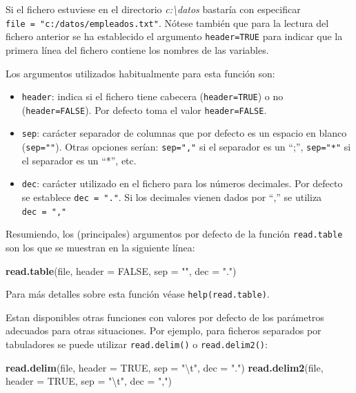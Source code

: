 \documentclass[]{book}
\newenvironment{Shaded}{\begin{snugshade}}{\end{snugshade}}
\newcommand{\CharTok}[1]{\textcolor[rgb]{0.31,0.60,0.02}{#1}}
\newcommand{\DataTypeTok}[1]{\textcolor[rgb]{0.13,0.29,0.53}{#1}}
\newcommand{\KeywordTok}[1]{\textcolor[rgb]{0.13,0.29,0.53}{\textbf{#1}}}
\newcommand{\NormalTok}[1]{#1}
\newcommand{\OtherTok}[1]{\textcolor[rgb]{0.56,0.35,0.01}{#1}}
\newcommand{\StringTok}[1]{\textcolor[rgb]{0.31,0.60,0.02}{#1}}
\begin{document}
Si el fichero estuviese en el directorio \emph{c:\textbackslash{}datos} bastaría con especificar
\texttt{file\ =\ "c:/datos/empleados.txt"}.
Nótese también que para la lectura del fichero anterior se ha
establecido el argumento \texttt{header=TRUE} para indicar que la primera línea del
fichero contiene los nombres de las variables.

Los argumentos utilizados habitualmente para esta función son:

\begin{itemize}
\item
  \texttt{header}: indica si el fichero tiene cabecera (\texttt{header=TRUE}) o no
  (\texttt{header=FALSE}). Por defecto toma el valor \texttt{header=FALSE}.
\item
  \texttt{sep}: carácter separador de columnas que por defecto es un espacio
  en blanco (\texttt{sep=""}). Otras opciones serían: \texttt{sep=","} si el separador es
  un ``;'', \texttt{sep="*"} si el separador es un ``*'', etc.
\item
  \texttt{dec}: carácter utilizado en el fichero para los números decimales.
  Por defecto se establece \texttt{dec\ =\ "."}. Si los decimales vienen dados
  por ``,'' se utiliza \texttt{dec\ =\ ","}
\end{itemize}

Resumiendo, los (principales) argumentos por defecto de la función
\texttt{read.table} son los que se muestran en la siguiente línea:

\begin{Shaded}
\begin{Highlighting}[]
\KeywordTok{read.table}\NormalTok{(file, }\DataTypeTok{header =} \OtherTok{FALSE}\NormalTok{, }\DataTypeTok{sep =} \StringTok{""}\NormalTok{, }\DataTypeTok{dec =} \StringTok{"."}\NormalTok{)  }
\end{Highlighting}
\end{Shaded}

Para más detalles sobre esta función véase
\texttt{help(read.table)}.

Estan disponibles otras funciones con valores por defecto de los parámetros
adecuados para otras situaciones. Por ejemplo, para ficheros separados por tabuladores
se puede utilizar \texttt{read.delim()} o \texttt{read.delim2()}:

\begin{Shaded}
\begin{Highlighting}[]
\KeywordTok{read.delim}\NormalTok{(file, }\DataTypeTok{header =} \OtherTok{TRUE}\NormalTok{, }\DataTypeTok{sep =} \StringTok{"}\CharTok{\textbackslash{}t}\StringTok{"}\NormalTok{, }\DataTypeTok{dec =} \StringTok{"."}\NormalTok{)}
\KeywordTok{read.delim2}\NormalTok{(file, }\DataTypeTok{header =} \OtherTok{TRUE}\NormalTok{, }\DataTypeTok{sep =} \StringTok{"}\CharTok{\textbackslash{}t}\StringTok{"}\NormalTok{, }\DataTypeTok{dec =} \StringTok{","}\NormalTok{)}
\end{Highlighting}
\end{Shaded}
\end{document}
